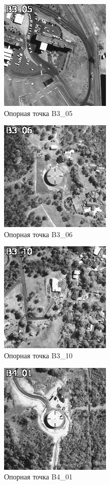 \documentclass[
  12pt,
]{book}
\begin{document}
\begin{figure}
\centering
\includegraphics{images/Ref17/B3_05.jpeg}
\caption{Опорная точка B3\_05}
\end{figure}

\begin{figure}
\centering
\includegraphics{images/Ref17/B3_06.jpeg}
\caption{Опорная точка B3\_06}
\end{figure}

\begin{figure}
\centering
\includegraphics{images/Ref17/B3_10.jpeg}
\caption{Опорная точка B3\_10}
\end{figure}

\begin{figure}
\centering
\includegraphics{images/Ref17/B4_01.jpeg}
\caption{Опорная точка B4\_01}
\end{figure}
\end{document}
